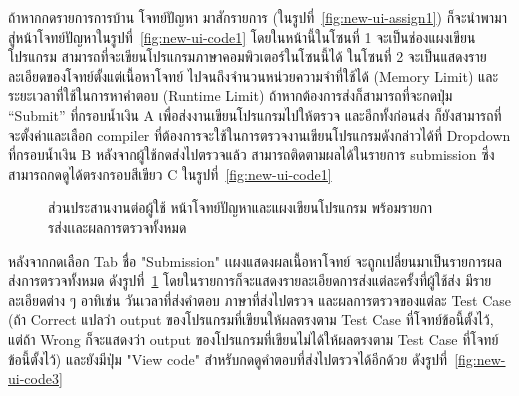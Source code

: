 \documentclass[12pt,one side,openright,a4paper]{cpe-thesis-th}
\newcommand{\thaijustify}[1]{%
  \par\hspace{30pt}\justifying
  #1
}
\begin{document}
                \thaijustify{
                    ถ้าหากกดรายการการบ้าน โจทย์ปัญหา มาสักรายการ (ในรูปที่~\ref{fig:new-ui-assign1}) ก็จะนำพามาสู่หน้าโจทย์ปัญหาในรูปที่~\ref{fig:new-ui-code1} โดยในหน้านี้ในโซนที่ 1 จะเป็นช่องแผงเขียนโปรแกรม สามารถที่จะเขียนโปรแกรมภาษาคอมพิวเตอร์ในโซนนี้ได้ ในโซนที่ 2 จะเป็นแสดงรายละเอียดของโจทย์ตั้งแต่เนื้อหาโจทย์ ไปจนถึงจำนวนหน่วยความจำที่ใช้ได้ (Memory Limit) และระยะเวลาที่ใช้ในการหาคำตอบ (Runtime Limit) ถ้าหากต้องการส่งก็สามารถที่จะกดปุ่ม “Submit” ที่กรอบน้ำเงิน A เพื่อส่งงานเขียนโปรแกรมไปให้ตรวจ และอีกทั้งก่อนส่ง ก็ยังสามารถที่จะตั้งค่าและเลือก compiler ที่ต้องการจะใช้ในการตรวจงานเขียนโปรแกรมดังกล่าวได้ที่ Dropdown ที่กรอบน้ำเงิน B หลังจากผู้ใช้กดส่งไปตรวจแล้ว สามารถติดตามผลได้ในรายการ submission ซึ่งสามารถกดดูได้ตรงกรอบสีเขียว C ในรูปที่~\ref{fig:new-ui-code1} 
                }
                \begin{figure}[H]
                    \centering
                    \caption[ส่วนประสานต่อผู้ใช้ หน้าแผงเขียนโปรแกรมและรายการส่งพร้อทผลการตรวจ]{ส่วนประสานงานต่อผู้ใช้ หน้าโจทย์ปัญหาและแผงเขียนโปรแกรม พร้อมรายการส่งเเละผลการตรวจทั้งหมด}
                    \label{fig:new-ui-code2}
                \end{figure}
                \thaijustify{
                    หลังจากกดเลือก Tab ชื่อ "Submission" เเผงแสดงผลเนื้อหาโจทย์ จะถูกเปลี่ยนมาเป็นรายการผลส่งการตรวจทั้งหมด ดังรูปที่~\ref{fig:new-ui-code2} โดยในรายการก็จะแสดงรายละเอียดการส่งแต่ละครั้งที่ผู้ใช้ส่ง มีรายละเอียดต่าง ๆ อาทิเช่น วันเวลาที่ส่งคำตอบ ภาษาที่ส่งไปตรวจ และผลการตรวจของแต่ละ Test Case (ถ้า Correct แปลว่า output ของโปรแกรมที่เขียนให้ผลตรงตาม Test Case ที่โจทย์ข้อนี้ตั้งไว้, แต่ถ้า Wrong ก็จะแสดงว่า output ของโปรแกรมที่เขียนไม่ได้ให้ผลตรงตาม Test Case ที่โจทย์ข้อนี้ตั้งไว้) และยังมีปุ่ม "View code" สำหรับกดดูคำตอบที่ส่งไปตรวจได้อีกด้วย ดังรูปที่~\ref{fig:new-ui-code3}
                }
            
\end{document}
